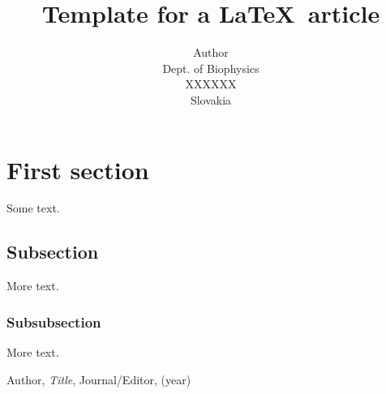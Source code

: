 \documentclass{article}
\title{Template for a \LaTeX\ article}
\author{Author\\
  \small Dept. of Biophysics\\
  \small XXXXXX\\
  \small Slovakia 
}
\theoremstyle{definition}
\theoremstyle{remark}
\begin{document}
\maketitle


\section{First section}

Some text. 
\subsection{Subsection}\label{sec:nothing}

More text.

\subsubsection{Subsubsection}\label{sec:nothing2}

More text.

\begin{thebibliography}{99}

 Author, \emph{Title}, Journal/Editor, (year)

\end{thebibliography}
\end{document}

